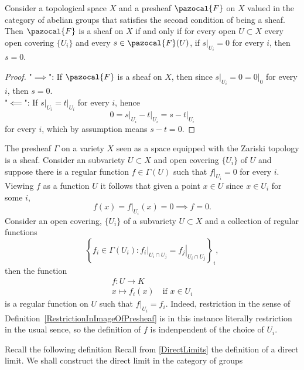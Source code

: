 \begin{lemma}
    Consider a topological space $X$ and a presheaf $\pazocal{F}$ on $X$ valued in the category of abelian groups that satisfies the second condition of being a sheaf. Then $\pazocal{F}$ is a sheaf on $X$ if and only if for every open $U\subset X$ every open covering $\{U_i\}$ and every $s\in \pazocal{F}(U)$, if $\left.s\right|_{U_i}=0$ for every $i$, then $s=0$.   
\end{lemma}
\begin{proof}
    "$\implies$": If $\pazocal{F}$ is a sheaf on $X$, then since $\left. s\right|_{U_i}=0=\left.0\right|_{0}$ for every $i$, then $s=0$.\\
    "$\impliedby$": If $\left. s\right|_{U_i} = \left. t\right|_{U_i}$ for every $i$, hence 
    $$0=\left. s\right|_{U_i} - \left. t\right|_{U_i} = \left. s-t\right|_{U_i}$$
    for every $i$, which by assumption means $s-t=0$. 
\end{proof}
\begin{example}
    The presheaf $\Gamma$ on a variety $X$ seen as a space equipped with the Zariski topology is a sheaf. Consider an subvariety $U\subset X$ and open covering $\{U_i\}$ of $U$ and suppose there is a regular function $f\in \Gamma(U)$ such that $\left. f\right|_{U_i}=0$ for every $i$. Viewing $f$ as a function $U$ it follows that given a point $x\in U$ since $x\in U_i$ for some $i$, 
    $$f(x)=\left.f\right|_{U_i}(x)= 0 \implies f = 0.$$
    Consider an open covering, $\{U_i\}$ of a subvariety $U\subset X$ and a collection of regular functions 
    $$\left\{f_i\in \Gamma(U_i): \left.f_i\right|_{U_i\cap U_j}= \left. f_j\right|_{U_i\cap U_j} \right\}_i,$$
    then the function 
    \begin{gather*}
        f : U \rightarrow K \\
         x\mapsto f_i(x) \quad \text{if } x\in U_i
    \end{gather*} 
    is a regular function on $U$ such that $\left. f\right|_{U_i} = f_i$. Indeed, restriction in the sense of Definition~\ref{RestrictionInImageOfPresheaf} is in this instance literally restriction in the usual sence, so the definition of $f$ is indenpendent of the choice of $U_i$.
\end{example}
Recall the following definition
Recall from \ref{DirectLimits} the definition of a direct limit. We shall construct the direct limit in the category of groups
